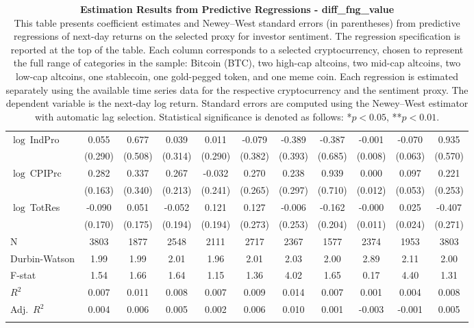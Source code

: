 \begin{table}[ht]
\begin{tabular}{l *{10}{c}}
\addlinespace
$\log\ $IndPro & 0.055 & 0.677 & 0.039 & 0.011 & -0.079 & -0.389 & -0.387 & -0.001 & -0.070 & 0.935 \\
 & (0.290) & (0.508) & (0.314) & (0.290) & (0.382) & (0.393) & (0.685) & (0.008) & (0.063) & (0.570) \\
\addlinespace
$\log\ $CPIPrc & 0.282 & 0.337 & 0.267 & -0.032 & 0.270 & 0.238 & 0.939 & 0.000 & 0.097 & 0.221 \\
 & (0.163) & (0.340) & (0.213) & (0.241) & (0.265) & (0.297) & (0.710) & (0.012) & (0.053) & (0.253) \\
\addlinespace
$\log\ $TotRes & -0.090 & 0.051 & -0.052 & 0.121 & 0.127 & -0.006 & -0.162 & -0.000 & 0.025 & -0.407 \\
 & (0.170) & (0.175) & (0.194) & (0.194) & (0.273) & (0.253) & (0.204) & (0.011) & (0.024) & (0.271) \\
\addlinespace
\midrule
N & 3803 & 1877 & 2548 & 2111 & 2717 & 2367 & 1577 & 2374 & 1953 & 3803 \\
Durbin-Watson & 1.99 & 1.99 & 2.01 & 1.96 & 2.01 & 2.03 & 2.00 & 2.89 & 2.11 & 2.00 \\
F-stat & 1.54 & 1.66 & 1.64 & 1.15 & 1.36 & 4.02 & 1.65 & 0.17 & 4.40 & 1.31 \\
\(R^2\) & 0.007 & 0.011 & 0.008 & 0.007 & 0.009 & 0.014 & 0.007 & 0.001 & 0.004 & 0.008 \\
Adj.\ \(R^2\) & 0.004 & 0.006 & 0.005 & 0.002 & 0.006 & 0.010 & 0.001 & -0.003 & -0.001 & 0.005 \\
\addlinespace
\midrule
\multicolumn{11}{c}{Specification tested: $R_{i,t+1} = \alpha_i + \beta_{sent} S_t + \phi R_{i,t} + \theta B_{i,t} + \gamma M_t + \varepsilon_{i,t+1}$}\\
\bottomrule
\end{tabular}
\caption{\textbf{Estimation Results from Predictive Regressions - diff_fng_value} \\
This table presents coefficient estimates and Newey--West standard errors (in parentheses) from predictive regressions of next-day returns on the selected proxy for investor sentiment. The regression specification is reported at the top of the table. Each column corresponds to a selected cryptocurrency, chosen to represent the full range of categories in the sample: Bitcoin (BTC), two high-cap altcoins, two mid-cap altcoins, two low-cap altcoins, one stablecoin, one gold-pegged token, and one meme coin. Each regression is estimated separately using the available time series data for the respective cryptocurrency and the sentiment proxy. The dependent variable is the next-day log return. Standard errors are computed using the Newey--West estimator with automatic lag selection. Statistical significance is denoted as follows: *$p<0.05$, **$p<0.01$.}
\label{tab:diff_fng_value_result_h1}
\end{table}